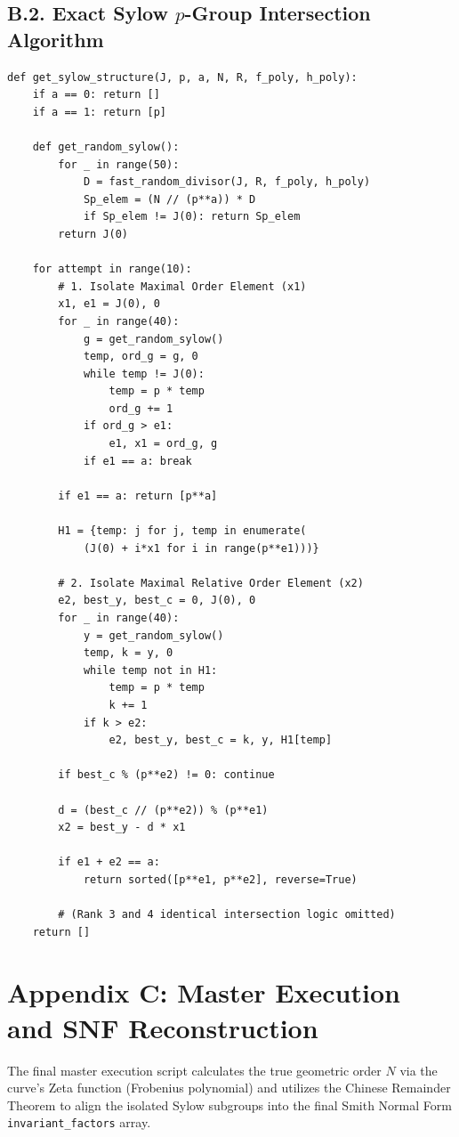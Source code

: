 \documentclass[letterpaper, 11pt]{article}
\begin{document}
\subsection{B.2. Exact Sylow \texorpdfstring{$p$}{p}-Group Intersection Algorithm}
\begin{lstlisting}
def get_sylow_structure(J, p, a, N, R, f_poly, h_poly):
    if a == 0: return []
    if a == 1: return [p]
    
    def get_random_sylow():
        for _ in range(50):
            D = fast_random_divisor(J, R, f_poly, h_poly)
            Sp_elem = (N // (p**a)) * D
            if Sp_elem != J(0): return Sp_elem
        return J(0)
        
    for attempt in range(10): 
        # 1. Isolate Maximal Order Element (x1)
        x1, e1 = J(0), 0
        for _ in range(40):
            g = get_random_sylow()
            temp, ord_g = g, 0
            while temp != J(0):
                temp = p * temp
                ord_g += 1
            if ord_g > e1:
                e1, x1 = ord_g, g
            if e1 == a: break
        
        if e1 == a: return [p**a]
        
        H1 = {temp: j for j, temp in enumerate(
            (J(0) + i*x1 for i in range(p**e1)))}
            
        # 2. Isolate Maximal Relative Order Element (x2)
        e2, best_y, best_c = 0, J(0), 0
        for _ in range(40):
            y = get_random_sylow()
            temp, k = y, 0
            while temp not in H1:
                temp = p * temp
                k += 1
            if k > e2:
                e2, best_y, best_c = k, y, H1[temp]
                
        if best_c % (p**e2) != 0: continue 
            
        d = (best_c // (p**e2)) % (p**e1)
        x2 = best_y - d * x1
        
        if e1 + e2 == a:
            return sorted([p**e1, p**e2], reverse=True)
            
        # (Rank 3 and 4 identical intersection logic omitted)
    return []
\end{lstlisting}

\section{Appendix C: Master Execution and SNF Reconstruction}
The final master execution script calculates the true geometric order $N$ via the curve's Zeta function (Frobenius polynomial) and utilizes the Chinese Remainder Theorem to align the isolated Sylow subgroups into the final Smith Normal Form \texttt{invariant\_factors} array.
\end{document}
